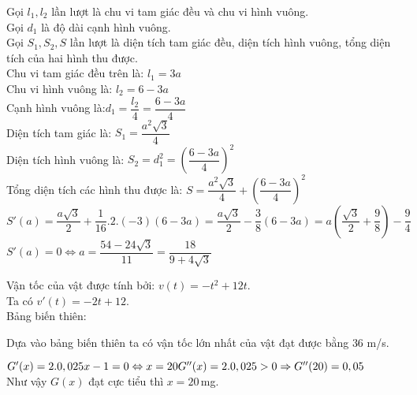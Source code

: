 \begin{Solbook}{23}
 \par \noindent  Gọi $l_1,l_2$ lần lượt là chu vi tam giác đều và chu vi hình vuông.\\ Gọi $d_1$ là độ dài cạnh hình vuông.\\ Gọi $S_1,S_2,S$ lần lượt là diện tích tam giác đều, diện tích hình vuông, tổng diện tích của hai hình thu được.\\ Chu vi tam giác đều trên là: $l_1=3a$\\ Chu vi hình vuông là: $l_2=6-3a$\\ Cạnh hình vuông là:$d_1=\dfrac {l_2}{4}=\dfrac {6-3a}{4}$\\ Diện tích tam giác là: $S_1=\dfrac {a^2\sqrt {3}}{4}$\\ Diện tích hình vuông là: $S_2=d_1^2=\left (\dfrac {6-3a}{4}\right )^2$ \\ Tổng diện tích các hình thu được là: $S=\dfrac {a^2\sqrt {3}}{4}+\left (\dfrac {6-3a}{4}\right )^2$\\ $S'(a)=\dfrac {a \sqrt 3}{2}+\dfrac {1}{16}.2.(-3)(6-3a)=\dfrac {a\sqrt 3}{2}-\dfrac {3}{8}(6-3a)=a\left ( \dfrac {\sqrt 3}{2}+\dfrac {9}{8}\right )-\dfrac {9}{4}$\\ $S'(a)=0 \Leftrightarrow a=\dfrac {54-24 \sqrt 3}{11}=\dfrac {18}{9+4\sqrt {3}}$  \par \noindent \selectC \hfill \qedEX 
\end{Solbook}
\begin{Solbook}{24}
 \par \noindent  Vận tốc của vật được tính bởi: $v(t)=-t^2+12t$.\\ Ta có $v'(t)=-2t+12$.\\ Bảng biến thiên: \begin {center}  \end {center} Dựa vào bảng biến thiên ta có vận tốc lớn nhất của vật đạt được bằng $36$ m/s.  \par \noindent \selectB \hfill \qedEX 
\end{Solbook}
\begin{Solbook}{25}
 \par \noindent  $G'(x)=2.0,025x-1= 0 \Leftrightarrow x=20\\ G''(x)=2.0,025>0 \Rightarrow G''(20)=0,05$\\ Như vậy $G(x)$ đạt cực tiểu thì $x=20 \,$mg.  \par \noindent \selectA \hfill \qedEX 
\end{Solbook}
